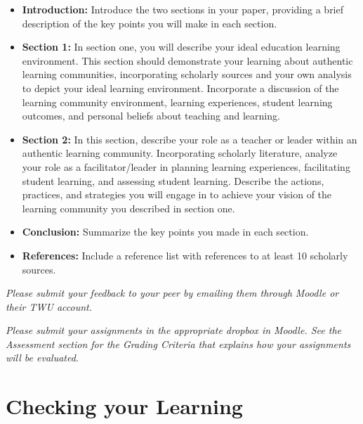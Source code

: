 \documentclass[
]{book}
\providecommand{\tightlist}{%
  \setlength{\itemsep}{0pt}\setlength{\parskip}{0pt}}
\begin{document}
\begin{assessment}
\begin{itemize}
\tightlist
\item
  \textbf{Introduction:} Introduce the two sections in your paper,
  providing a brief description of the key points you will make in each
  section.\\
\item
  \textbf{Section 1:} In section one, you will describe your ideal
  education learning environment. This section should demonstrate your
  learning about authentic learning communities, incorporating scholarly
  sources and your own analysis to depict your ideal learning
  environment. Incorporate a discussion of the learning community
  environment, learning experiences, student learning outcomes, and
  personal beliefs about teaching and learning.\\
\item
  \textbf{Section 2:} In this section, describe your role as a teacher
  or leader within an authentic learning community. Incorporating
  scholarly literature, analyze your role as a facilitator/leader in
  planning learning experiences, facilitating student learning, and
  assessing student learning. Describe the actions, practices, and
  strategies you will engage in to achieve your vision of the learning
  community you described in section one.\\
\item
  \textbf{Conclusion:} Summarize the key points you made in each
  section.\\
\item
  \textbf{References:} Include a reference list with references to at
  least 10 scholarly sources.
\end{itemize}

\emph{Please submit your feedback to your peer by emailing them through
Moodle or their TWU account.}
\end{assessment}

\begin{caution}
\emph{Please submit your assignments in the appropriate dropbox in
Moodle. See the Assessment section for the Grading Criteria that
explains how your assignments will be evaluated.}
\end{caution}

\hypertarget{checking-your-learning-8}{%
\section*{Checking your Learning}\label{checking-your-learning-8}}
\end{document}
